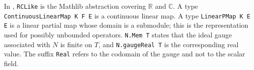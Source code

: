 \documentclass[11pt]{article}
\begin{document}
In , \texttt{RCLike} is the Mathlib abstraction
covering $\mathbb{R}$ and $\mathbb{C}$.  A type
\texttt{ContinuousLinearMap K F E} is a continuous linear map.  A type
\texttt{LinearPMap K E E} is a linear partial map whose
domain is a submodule; this is the representation used for possibly unbounded
operators.  \texttt{N.Mem T} states that the ideal gauge associated with $N$ is
finite on $T$, and \texttt{N.gaugeReal T} is the corresponding real value.  The
suffix \texttt{Real} refers to the codomain of the gauge and not to the scalar
field.


\end{document}
